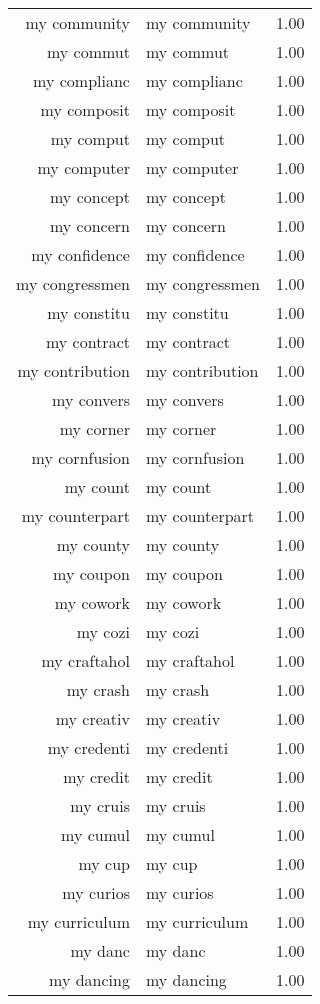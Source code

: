 \begin{table}[ht]
\begin{tabular}{rlr}
  my community & my community & 1.00 \\ 
  my commut & my commut & 1.00 \\ 
  my complianc & my complianc & 1.00 \\ 
  my composit & my composit & 1.00 \\ 
  my comput & my comput & 1.00 \\ 
  my computer & my computer & 1.00 \\ 
  my concept & my concept & 1.00 \\ 
  my concern & my concern & 1.00 \\ 
  my confidence & my confidence & 1.00 \\ 
  my congressmen & my congressmen & 1.00 \\ 
  my constitu & my constitu & 1.00 \\ 
  my contract & my contract & 1.00 \\ 
  my contribution & my contribution & 1.00 \\ 
  my convers & my convers & 1.00 \\ 
  my corner & my corner & 1.00 \\ 
  my cornfusion & my cornfusion & 1.00 \\ 
  my count & my count & 1.00 \\ 
  my counterpart & my counterpart & 1.00 \\ 
  my county & my county & 1.00 \\ 
  my coupon & my coupon & 1.00 \\ 
  my cowork & my cowork & 1.00 \\ 
  my cozi & my cozi & 1.00 \\ 
  my craftahol & my craftahol & 1.00 \\ 
  my crash & my crash & 1.00 \\ 
  my creativ & my creativ & 1.00 \\ 
  my credenti & my credenti & 1.00 \\ 
  my credit & my credit & 1.00 \\ 
  my cruis & my cruis & 1.00 \\ 
  my cumul & my cumul & 1.00 \\ 
  my cup & my cup & 1.00 \\ 
  my curios & my curios & 1.00 \\ 
  my curriculum & my curriculum & 1.00 \\ 
  my danc & my danc & 1.00 \\ 
  my dancing & my dancing & 1.00 \\ 

\end{tabular}
\end{table}
